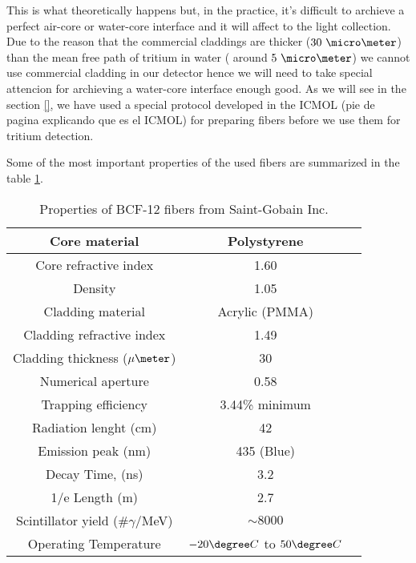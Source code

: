 This is what theoretically happens but, in the practice, it's difficult to archieve a perfect air-core or water-core interface and it will affect to the light collection. Due to the reason that the commercial claddings are thicker ($30~\micro \meter$) than the mean free path of tritium in water ( around $5~\micro\meter$) we cannot use commercial cladding in our detector hence we will need to take special attencion for archieving a water-core interface enough good. As we will see in the section \ref{}, we have used a special protocol developed in the ICMOL (pie de pagina explicando que es el ICMOL) for preparing fibers before we use them for tritium detection.

Some of the most important properties of the used fibers are summarized in the table \ref{tab:ParametersFibersBCF12}.

\begin{table}[htbp]
\begin{center}
\begin{tabular}{|c|c|c|}
\hline \hline 
Core material & Polystyrene \\ \hline
Core refractive index & 1.60 \\ \hline
Density & 1.05 \\ \hline
Cladding material & Acrylic (PMMA) \\ \hline
Cladding refractive index & 1.49 \\ \hline
Cladding thickness ($\mu\meter$) & 30 \\ \hline
Numerical aperture & 0.58 \\ \hline
Trapping efficiency & 3.44\% minimum \\ \hline
Radiation lenght (cm) & 42 \\ \hline
Emission peak (nm) & 435 (Blue) \\ \hline
Decay Time, (ns) & 3.2 \\ \hline
1/e Length (m) & 2.7 \\ \hline
Scintillator yield (\#$\gamma$/MeV) & $\sim 8000$ \\ \hline
Operating Temperature & $-20\degree C$ to $50\degree C$ \\ \hline
\end{tabular}
\caption{Properties of BCF-12 fibers from Saint-Gobain Inc. \cite{DataSheetBCF12Fiber}}
\label{tab:ParametersFibersBCF12}
\end{center}
\end{table}


